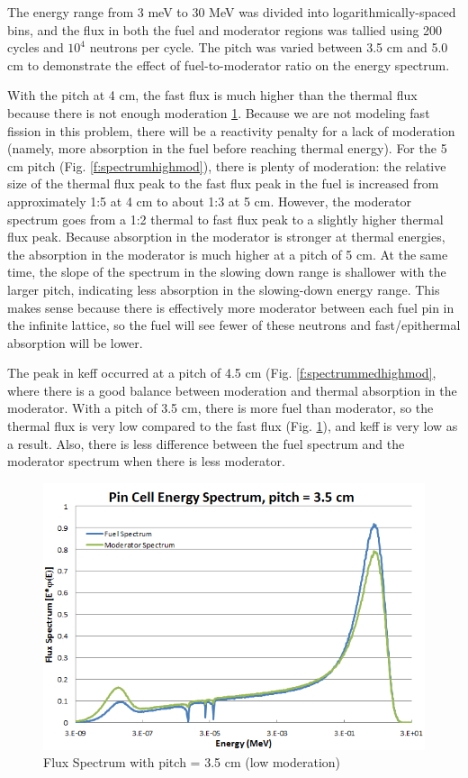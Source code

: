 The energy range from 3 meV to 30 MeV was divided into logarithmically-spaced bins, and the flux in both the fuel and moderator regions was tallied using 200 cycles and $10^4$ neutrons per cycle. The pitch was varied between 3.5 cm and 5.0 cm to demonstrate the effect of fuel-to-moderator ratio on the energy spectrum.

With the pitch at 4 cm, the fast flux is much higher than the thermal flux because there is not enough moderation \ref{f:spectrumlowmod}. Because we are not modeling fast fission in this problem, there will be a reactivity penalty for a lack of moderation (namely, more absorption in the fuel before reaching thermal energy). For the 5 cm pitch (Fig. \ref{f:spectrumhighmod}), there is plenty of moderation: the relative size of the thermal flux peak to the fast flux peak in the fuel is increased from approximately 1:5 at 4 cm to about 1:3 at 5 cm. However, the moderator spectrum goes from a 1:2 thermal to fast flux peak to a slightly higher thermal flux peak. Because absorption in the moderator is stronger at thermal energies, the absorption in the moderator is much higher at a pitch of 5 cm. At the same time, the slope of the spectrum in the slowing down range is shallower with the larger pitch, indicating less absorption in the slowing-down energy range. This makes sense because there is effectively more moderator between each fuel pin in the infinite lattice, so the fuel will see fewer of these neutrons and fast/epithermal absorption will be lower. 

The peak in keff occurred at a pitch of 4.5 cm (Fig. \ref{f:spectrummedhighmod}, where there is a good balance between moderation and thermal absorption in the moderator. With a pitch of 3.5 cm, there is more fuel than moderator, so the thermal flux is very low compared to the fast flux (Fig. \ref{f:spectrumlowmod}), and keff is very low as a result. Also, there is less difference between the fuel spectrum and the moderator spectrum when there is less moderator.

\begin{figure}[H]
\centering
\includegraphics[width=0.8\linewidth]{images/spectrum_lowmod.png}
\caption{Flux Spectrum with pitch = 3.5 cm (low moderation)}
\label{f:spectrumlowmod}
\end{figure}

